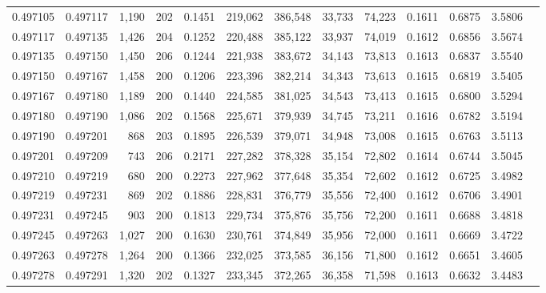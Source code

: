 \begin{tabular}{rrrrrrrrrrrrr}
0.497105 & 0.497117 & 1,190 & 202 &                                     0.1451 & 219,062 & 386,548 &  33,733 &  74,223 & 0.1611 & 0.6875 & 3.5806 \\
0.497117 & 0.497135 & 1,426 & 204 &                                     0.1252 & 220,488 & 385,122 &  33,937 &  74,019 & 0.1612 & 0.6856 & 3.5674 \\
0.497135 & 0.497150 & 1,450 & 206 &                                     0.1244 & 221,938 & 383,672 &  34,143 &  73,813 & 0.1613 & 0.6837 & 3.5540 \\
0.497150 & 0.497167 & 1,458 & 200 &                                     0.1206 & 223,396 & 382,214 &  34,343 &  73,613 & 0.1615 & 0.6819 & 3.5405 \\
0.497167 & 0.497180 & 1,189 & 200 &                                     0.1440 & 224,585 & 381,025 &  34,543 &  73,413 & 0.1615 & 0.6800 & 3.5294 \\
0.497180 & 0.497190 & 1,086 & 202 &                                     0.1568 & 225,671 & 379,939 &  34,745 &  73,211 & 0.1616 & 0.6782 & 3.5194 \\
0.497190 & 0.497201 &   868 & 203 &                                     0.1895 & 226,539 & 379,071 &  34,948 &  73,008 & 0.1615 & 0.6763 & 3.5113 \\
0.497201 & 0.497209 &   743 & 206 &                                     0.2171 & 227,282 & 378,328 &  35,154 &  72,802 & 0.1614 & 0.6744 & 3.5045 \\
0.497210 & 0.497219 &   680 & 200 &                                     0.2273 & 227,962 & 377,648 &  35,354 &  72,602 & 0.1612 & 0.6725 & 3.4982 \\
0.497219 & 0.497231 &   869 & 202 &                                     0.1886 & 228,831 & 376,779 &  35,556 &  72,400 & 0.1612 & 0.6706 & 3.4901 \\
0.497231 & 0.497245 &   903 & 200 &                                     0.1813 & 229,734 & 375,876 &  35,756 &  72,200 & 0.1611 & 0.6688 & 3.4818 \\
0.497245 & 0.497263 & 1,027 & 200 &                                     0.1630 & 230,761 & 374,849 &  35,956 &  72,000 & 0.1611 & 0.6669 & 3.4722 \\
0.497263 & 0.497278 & 1,264 & 200 &                                     0.1366 & 232,025 & 373,585 &  36,156 &  71,800 & 0.1612 & 0.6651 & 3.4605 \\
0.497278 & 0.497291 & 1,320 & 202 &                                     0.1327 & 233,345 & 372,265 &  36,358 &  71,598 & 0.1613 & 0.6632 & 3.4483 \\

\end{tabular}
